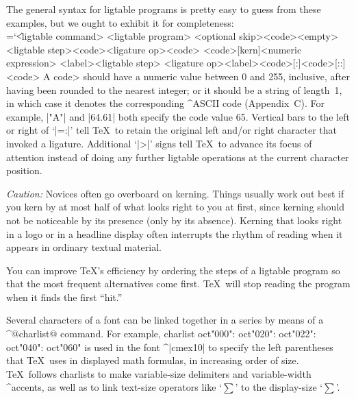 The general syntax for ligtable programs is pretty easy to guess from
these examples, but we ought to exhibit it for completeness:
\beginsyntax \chardef\\=`\|
<ligtable command>
<ligtable program>
<optional skip>\is[,] [skipto]<code>\alt<empty>
<ligtable step>\is<code><ligature op><code>
 \alt<code>[kern]<numeric expression>
 \alt<label><ligtable step>
<ligature op>\is[=:]\alt[\\=:]\alt[\\=:>]\alt[=:\\]\alt[=:\\>]%
  \alt[\\=:\\]\alt[\\=:\\>]\alt[\\=:\\>>]
<label>\is<code>[:]\alt<code>[::]\alt[\\\\:]
<code>
\endsyntax
A \<code> should have a numeric value between 0 and 255, inclusive,
after having been rounded to the nearest integer; or it should be a
string of length~1, in which case it denotes the corresponding
^{ASCII} code (Appendix~C\null). For example, |"A"| and |64.61| both
specify the code value 65. Vertical bars to the left or right of `|=:|'
tell \TeX\ to retain the original left and/or right character that invoked a
ligature. Additional `|>|' signs tell \TeX\ to advance its focus of attention
instead of doing any further ligtable operations at the current
character position.

{\sl Caution:\/} Novices often go overboard on kerning. Things usually
work out best if you kern by at most half of what looks right to you
at first, since kerning should not be noticeable by its presence
(only by its absence). Kerning that looks right in a logo or in a
headline display often interrupts the rhythm of reading when it appears
in ordinary textual material.

You can improve \TeX's efficiency by ordering the steps of a ligtable
program so that the most frequent alternatives come first.
\TeX\ will stop reading the program when it finds the first ``hit.''

\medbreak
Several characters of a font can be linked together in a series
by means of a ^@charlist@ command. For example,
\begintt
charlist oct"000": oct"020": oct"022": oct"040": oct"060"
\endtt
is used in the font ^|cmex10| to specify the left parentheses that
\TeX\ uses in displayed math formulas, in increasing order of size.
\TeX\ follows charlists to make variable-size delimiters and
variable-width ^{accents}, as well as to link text-size operators
like `$\sum$' to the display-size `$\displaystyle\sum$'.


